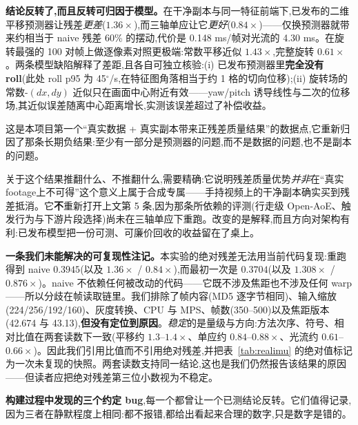 \documentclass[UTF8,12pt,a4paper]{ctexart}
\begin{document}
\textbf{结论反转了,而且反转可归因于模型。}在干净副本与同一特征前端下,已发布的二维平移预测器让残差\emph{更差}($1.36\times$),而三轴单应让它\emph{更好}($0.84\times$)——仅换预测器就带来约相当于 naive 残差 60\% 的摆动,代价是 0.148 ms/帧对光流的 4.30 ms。在旋转最强的 100 对帧上做逐像素对照更极端:常数平移近似 $1.43\times$,完整旋转 $0.61\times$。两条模型缺陷解释了差距,且各自可独立核验:(i) 已发布预测器里\textbf{完全没有 roll}(此处 roll p95 为 45$^\circ$/s,在特征图角落相当于约 1 格的切向位移);(ii) 旋转场的常数-$(dx,dy)$ 近似只在画面中心附近有效——yaw/pitch 诱导线性与二次的位移场,其近似误差随离中心距离增长,实测该误差超过了补偿收益。

这是本项目第一个``真实数据 + 真实副本带来正残差质量结果''的数据点,它重新归因了那条长期负结果:至少有一部分是预测器的问题,而不是数据的问题,也不是副本的问题。

关于这个结果推翻什么、不推翻什么,需要精确:它说明残差质量优势\emph{并非}在``真实footage上不可得''这个意义上属于合成专属——手持视频上的干净副本确实买到残差抵消。它\textbf{不}重新打开上文第 5 条,因为那条所依赖的评测(行走级 Open-AoE、触发行为与下游片段选择)尚未在三轴单应下重跑。改变的是解释,而且方向对架构有利:已发布模型把一份可测、可廉价回收的收益留在了桌上。

\textbf{一条我们未能解决的可复现性注记。}本实验的绝对残差无法用当前代码复现:重跑得到 naive $0.3945$(以及 $1.36\times$ / $0.84\times$),而最初一次是 $0.3704$(以及 $1.308\times$ / $0.876\times$)。naive 不依赖任何被改动的代码——它既不涉及焦距也不涉及任何 warp——所以分歧在帧读取链里。我们排除了帧内容(MD5 逐字节相同)、输入缩放(224/256/192/160)、灰度转换、CPU 与 MPS、帧数(350--500)以及焦距版本(42.674 与 43.13),\textbf{但没有定位到原因}。\emph{稳定}的是量级与方向:方法次序、符号、相对比值在两套读数下一致(平移约 $1.3$--$1.4\times$、单应约 $0.84$--$0.88\times$、光流约 $0.61$--$0.66\times$)。因此我们引用比值而不引用绝对残差,并把表~\ref{tab:realimu} 的绝对值标记为一次未复现的快照。两套读数支持同一结论,这也是我们仍然报告该结果的原因——但读者应把绝对残差第三位小数视为不稳定。

\textbf{构建过程中发现的三个约定 bug},每一个都曾让一个已测结论反转。它们值得记录,因为三者在静默程度上相同:都不报错,都给出看起来合理的数字,只是数字是错的。
\end{document}
